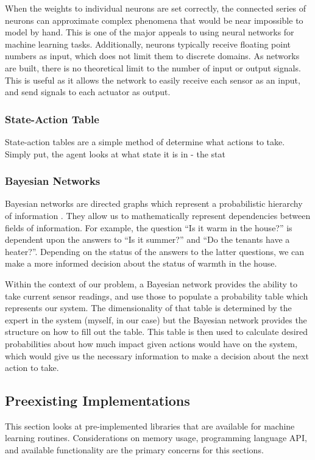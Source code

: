 When the weights to individual neurons are set correctly, the connected series of neurons can approximate complex phenomena that would be near impossible to model by hand.
This is one of the major appeals to using neural networks for machine learning tasks.
Additionally, neurons typically receive floating point numbers as input, which does not limit them to discrete domains.
As networks are built, there is no theoretical limit to the number of input or output signals.
This is useful as it allows the network to easily receive each sensor as an input, and send signals to each actuator as output.

\subsubsection{State-Action Table}
State-action tables are a simple method of determine what actions to take.
Simply put, the agent looks at what state it is in - the stat

\subsubsection{Bayesian Networks}
Bayesian networks are directed graphs which represent a probabilistic hierarchy of information \cite{RussellNorvig}.
They allow us to mathematically represent dependencies between fields of information.
For example, the question ``Is it warm in the house?'' is dependent upon the answers to ``Is it summer?'' and ``Do the tenants have a heater?''.
Depending on the status of the answers to the latter questions, we can make a more informed decision about the status of warmth in the house.

Within the context of our problem, a Bayesian network provides the ability to take current sensor readings, and use those to populate a probability table which represents our system.
The dimensionality of that table is determined by the expert in the system (myself, in our case) but the Bayesian network provides the structure on how to fill out the table.
This table is then used to calculate desired probabilities about how much impact given actions would have on the system, which would give us the necessary information to make a decision about the next action to take.

\subsection{Preexisting Implementations}
This section looks at pre-implemented libraries that are available for machine learning routines.
Considerations on memory usage, programming language API, and available functionality are the primary concerns for this sections.
